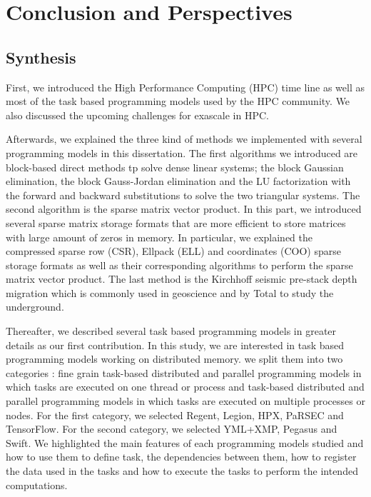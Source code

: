\chapter{Conclusion and Perspectives \label{chap:ccl}}
\section{Synthesis}

First, we introduced the High Performance Computing (HPC) time line as well as most of the task based programming models used by the HPC community.
We also discussed the upcoming challenges for exascale in HPC.

Afterwards, we explained the three kind of methods we implemented with several programming models in this dissertation.
The first algorithms we introduced are block-based direct methods tp solve dense linear systems; the block Gaussian elimination, the block Gauss-Jordan elimination and the LU factorization with the forward and backward substitutions to solve the two triangular systems.
The second algorithm is the sparse matrix vector product.
In this part, we introduced several sparse matrix storage formats that are more efficient to store matrices with large amount of zeros in memory.
In particular, we explained the compressed sparse row (CSR), Ellpack (ELL) and coordinates (COO) sparse storage formats as well as their corresponding algorithms to perform the sparse matrix vector product.
The last method is the Kirchhoff seismic pre-stack depth migration which is commonly used in geoscience and by Total to study the underground.

Thereafter, we described several task based programming models in greater details as our first contribution.
In this study, we are interested in task based programming models working on distributed memory.
we split them into two categories : fine grain task-based distributed and parallel programming models in which tasks are executed on one thread or process and task-based distributed and parallel programming models in which tasks are executed on multiple processes or nodes.
For the first category, we selected Regent, Legion, HPX, PaRSEC and TensorFlow.
For the second category, we selected YML+XMP, Pegasus and Swift.
We highlighted the main features of each programming models studied and how to use them to define task, the dependencies between them, how to register the data used in the tasks and how to execute the tasks to perform the intended computations.

